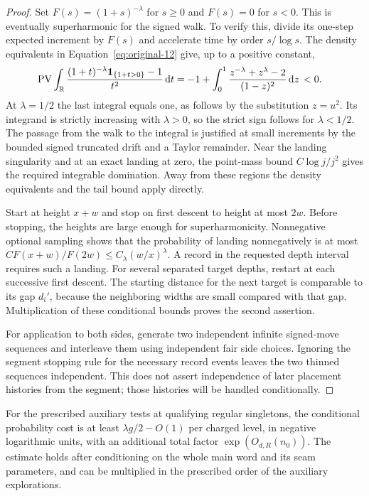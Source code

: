 \begin{proof}
Set $F(s)=(1+s)^{-\lambda}$ for $s\ge0$ and $F(s)=0$ for
$s<0$.  This is eventually superharmonic for the signed walk.  To
verify this, divide its one-step expected increment by $F(s)$ and
accelerate time by order $s/\log s$.  The density equivalents in
Equation~\eqref{eq:original-12} give, up to a positive constant,
\begin{equation}\label{addr:superharmonic-integral}
\begin{split}
 \operatorname{PV}\int_{\mathbb R}
 \frac{(1+t)^{-\lambda}\mathbf 1_{\{1+t>0\}}-1}{t^2}\,\mathrm d t
 &=-1+\int_0^1
       \frac{z^{-\lambda}+z^\lambda-2}{(1-z)^2}\,\mathrm d z\,<0.
\end{split}
\end{equation}
At $\lambda=1/2$ the last integral equals one, as follows by the
substitution $z=u^2$.  Its integrand is strictly increasing with
$\lambda>0$, so the strict sign follows for $\lambda<1/2$.
The passage from the walk to the integral is justified at small
increments by the bounded signed truncated drift and a Taylor
remainder.  Near the landing singularity and at an exact landing at
zero, the point-mass bound $C\log j/j^2$ gives the required
integrable domination.  Away from these regions the density
equivalents and the tail bound apply directly.

Start at height $x+w$ and stop on first descent to height at most
$2w$.  Before stopping, the heights are large enough for
superharmonicity.  Nonnegative optional sampling shows that the
probability of landing nonnegatively is at most
$C F(x+w)/F(2w)\le C_\lambda(w/x)^\lambda$.
A record in the requested depth interval requires such a landing.
For several separated target depths, restart at each successive
first descent.  The starting distance for the next target is
comparable to its gap $d_i'$, because the neighboring widths are
small compared with that gap.  Multiplication of these conditional
bounds proves the second assertion.

For application to both sides, generate two independent infinite
signed-move sequences and interleave them using independent fair side
choices.  Ignoring the segment stopping rule for the necessary record
events leaves the two thinned sequences independent.  This does not
assert independence of later placement histories from the segment;
those histories will be handled conditionally.
\end{proof}

\begin{lemma}\label{addr:auxiliary-charge}
For the prescribed auxiliary tests at qualifying regular singletons,
the conditional probability cost is at least
$\lambda g/2-O(1)$ per charged level, in negative logarithmic
units, with an additional total factor $\exp(O_{d,R}(n_0))$.
The estimate holds after conditioning on the whole main word and
its seam parameters, and can be multiplied in the prescribed order
of the auxiliary explorations.
\end{lemma}

